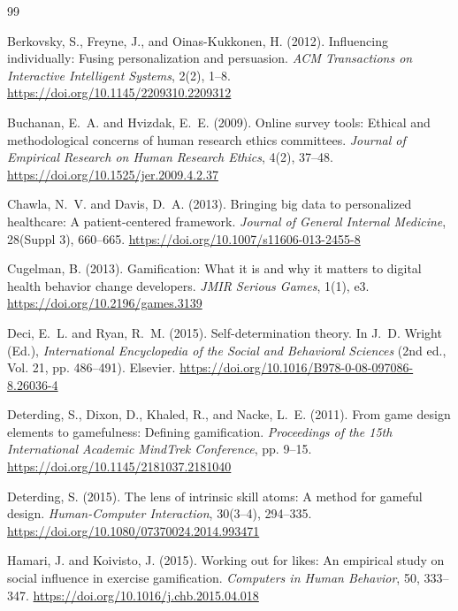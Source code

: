 \documentclass[12pt, a4paper]{report}
\begin{document}

\begin{thebibliography}{99}

Berkovsky, S., Freyne, J., and Oinas-Kukkonen, H. (2012).
Influencing individually: Fusing personalization and persuasion.
\textit{ACM Transactions on Interactive Intelligent Systems}, 2(2), 1--8.
\url{https://doi.org/10.1145/2209310.2209312}

Buchanan, E.~A. and Hvizdak, E.~E. (2009).
Online survey tools: Ethical and methodological concerns of human research ethics committees.
\textit{Journal of Empirical Research on Human Research Ethics}, 4(2), 37--48.
\url{https://doi.org/10.1525/jer.2009.4.2.37}

Chawla, N.~V. and Davis, D.~A. (2013).
Bringing big data to personalized healthcare: A patient-centered framework.
\textit{Journal of General Internal Medicine}, 28(Suppl 3), 660--665.
\url{https://doi.org/10.1007/s11606-013-2455-8}

Cugelman, B. (2013).
Gamification: What it is and why it matters to digital health behavior change developers.
\textit{JMIR Serious Games}, 1(1), e3.
\url{https://doi.org/10.2196/games.3139}

Deci, E.~L. and Ryan, R.~M. (2015).
Self-determination theory.
In J.~D. Wright (Ed.), \textit{International Encyclopedia of the Social and Behavioral Sciences} (2nd ed., Vol. 21, pp. 486--491). Elsevier.
\url{https://doi.org/10.1016/B978-0-08-097086-8.26036-4}

Deterding, S., Dixon, D., Khaled, R., and Nacke, L.~E. (2011).
From game design elements to gamefulness: Defining gamification.
\textit{Proceedings of the 15th International Academic MindTrek Conference}, pp. 9--15.
\url{https://doi.org/10.1145/2181037.2181040}

Deterding, S. (2015).
The lens of intrinsic skill atoms: A method for gameful design.
\textit{Human-Computer Interaction}, 30(3--4), 294--335.
\url{https://doi.org/10.1080/07370024.2014.993471}

Hamari, J. and Koivisto, J. (2015).
Working out for likes: An empirical study on social influence in exercise gamification.
\textit{Computers in Human Behavior}, 50, 333--347.
\url{https://doi.org/10.1016/j.chb.2015.04.018}


\end{thebibliography}
\end{document}
